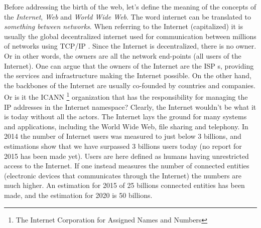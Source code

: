 \documentclass[a4paper,11pt]{kth-mag}
\newcommand\abbr[2][]{\uppercase{#2}\ifthenelse{\equal{#1}{}}%
                     {}{#1}}
\begin{document}
      Before addressing the birth of the web, let's  define the meaning of the concepts of the \emph{Internet}, \emph{Web} and \emph{World Wide Web}.
      The word internet can be translated to \emph{something between networks}. 
      When referring to the Internet (capitalized) it is usually the global decentralized internet used for communication between millions of networks using \abbr{tcp/ip}.
      Since the Internet is decentralized, there is no owner.
      Or in other words, the owners are all the network end-points (all users of the Internet).
      One can argue that the owners of the Internet are the \abbr[s]{isp}, providing the services and infrastructure making the Internet possible.
      On the other hand, the backbones of the Internet are usually co-founded by countries and companies. 
      Or is it the \abbr{icann}\footnote{The Internet Corporation for Assigned Names and Numbers} organization that has the responsibility for managing the \abbr{ip} addresses in the Internet namespace? 
      Clearly, the Internet wouldn't be what it is today without all the actors.
      The Internet lays the ground for many systems and applications, including the World Wide Web, file sharing and telephony.
      In 2014 the number of Internet users was measured to just below 3 billions, and estimations show that we have surpassed 3 billions users today (no report for 2015 has been made yet).
      Users are here defined as humans having unrestricted access to the Internet.
      If one instead measures the number of connected entities (electronic devices that communicates through the Internet) the numbers are much higher.
      An estimation for 2015 of 25 billions connected entities has been made, and the estimation for 2020 is 50 billions.
      
\end{document}
